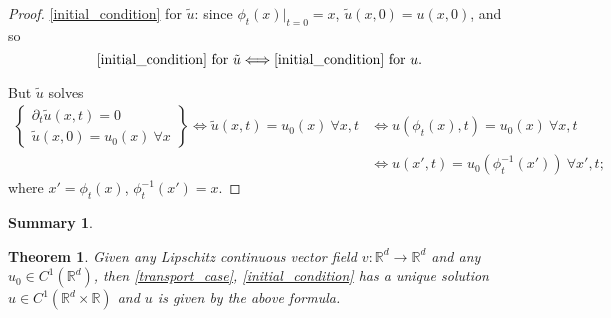 \documentclass[12pt]{article}
\newtheorem{theorem}{Theorem}[section]
\theoremstyle{definition}
\newtheorem*{summary}{Summary}
\begin{document}
\begin{enumerate}[label=\alph*)]
\begin{proof}
\eqref{initial_condition} for $\tilde{u}$: since $\phi_t(x)|_{t=0}=x$, $\tilde{u}(x,0)=u(x,0)$, and so
\[\text{\eqref{initial_condition} for }\tilde{u}\Longleftrightarrow\text{\eqref{initial_condition} for }u.\]

But $\tilde{u}$ solves
\begin{align*}
\left\{\begin{array}{l}\partial_t\tilde{u}(x,t)=0\\\tilde{u}(x,0)=u_0(x)\ \forall x\end{array}\right\}\Longleftrightarrow\tilde{u}(x,t)=u_0(x)\ \forall x,t&\Longleftrightarrow u(\phi_t(x),t)=u_0(x)\ \forall x,t\\
&\Longleftrightarrow u(x',t)=u_0(\phi_t^{-1}(x'))\ \forall x',t;
\end{align*}
where $x'=\phi_t(x)$, $\phi_t^{-1}(x')=x$.
\end{proof}
\end{enumerate}

\begin{summary}
\begin{theorem}
Given any Lipschitz continuous vector field $v:\mathbb{R}^d\rightarrow\mathbb{R}^d$ and any $u_0\in C^1(\mathbb{R}^d)$, then \eqref{transport_case}, \eqref{initial_condition} has a unique solution $u\in C^1(\mathbb{R}^d\times\mathbb{R})$ and $u$ is given by the above formula.
\end{theorem}
\end{summary}
\end{document}
